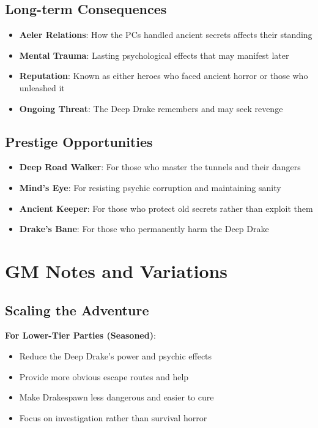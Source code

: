 \documentclass[11pt]{article}
\begin{document}
\subsection{Long-term Consequences}

\begin{itemize}
\item \textbf{Aeler Relations}: How the PCs handled ancient secrets affects their standing
\item \textbf{Mental Trauma}: Lasting psychological effects that may manifest later
\item \textbf{Reputation}: Known as either heroes who faced ancient horror or those who unleashed it
\item \textbf{Ongoing Threat}: The Deep Drake remembers and may seek revenge
\end{itemize}

\subsection{Prestige Opportunities}

\begin{itemize}
\item \textbf{Deep Road Walker}: For those who master the tunnels and their dangers
\item \textbf{Mind's Eye}: For resisting psychic corruption and maintaining sanity
\item \textbf{Ancient Keeper}: For those who protect old secrets rather than exploit them
\item \textbf{Drake's Bane}: For those who permanently harm the Deep Drake
\end{itemize}

\section{GM Notes and Variations}

\subsection{Scaling the Adventure}

\textbf{For Lower-Tier Parties (Seasoned)}:
\begin{itemize}
\item Reduce the Deep Drake's power and psychic effects
\item Provide more obvious escape routes and help
\item Make Drakespawn less dangerous and easier to cure
\item Focus on investigation rather than survival horror
\end{itemize}
\end{document}
